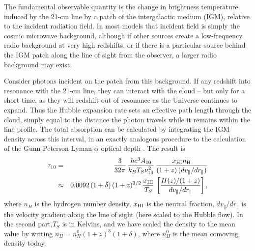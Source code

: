 The fundamental observable quantity is the change in brightness temperature induced by the 21-cm line by a patch of the intergalactic medium (IGM), relative to the incident radiation field. In most models that incident field is simply the cosmic microwave background, although if other sources create a low-frequency radio background at very high redshifts, or if there is a particular source behind the IGM patch along the line of sight from the observer, a larger radio background may exist.

Consider photons incident on the patch from this background. If any redshift into resonance with the 21-cm line, they can interact with the cloud -- but only for a short time, as they will redshift out of resonance as the Universe continues to expand. Thus the Hubble expansion rate sets an effective path length through the cloud, simply equal to the distance the photon travels while it remains within the line profile. The total absorption can be calculated by integrating the IGM density across this interval, in an exactly analogous procedure to the calculation of the Gunn-Peterson Lyman-$\alpha$ optical depth \cite{field59-obs, gunn65, scheuer65}. The result is
\begin{eqnarray}
\tau_{10} & = & \frac{3}{32 \pi} \, \frac{h c^3 A_{10}}{k_B T_S \nu_{10}^2} \, \frac{x_{\rm HI} n_{\rm H}}{(1+z) \, (d v_\parallel/d r_\parallel)}  \label{eq:optdepthcosmo} \\
 & \approx  & 0.0092 \, (1+\delta) \, (1+z)^{3/2}\, \frac{x_{\rm HI}}{T_S} \, \left[ \frac{H(z)/(1+z)}{d v_\parallel/d r_\parallel} \right],
\label{optdepthcosmo-approx}
\end{eqnarray}
where $n_H$ is the hydrogen number density, $x_{\rm HI}$ is the neutral fraction, $dv_\parallel/dr_\parallel$ is the velocity gradient along the line of sight (here scaled to the Hubble flow). In the second part,$T_S$ is in Kelvins, and we have scaled the density to the mean value by writing $n_H = \bar{n}_H^0 (1+z)^3 (1 + \delta)$, where $\bar{n}_H^0$ is the mean comoving density today.

